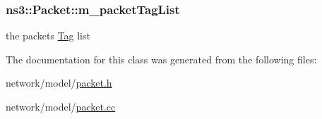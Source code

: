 \subsubsection[{\texorpdfstring{m\+\_\+packet\+Tag\+List}{m_packetTagList}}]{ ns3\+::\+Packet\+::m\+\_\+packet\+Tag\+List\hspace{0.3cm}{\ttfamily [private]}}\hypertarget{classns3_1_1Packet_a7c91fc548c7cfddf27c176e13bd858ff}{}\label{classns3_1_1Packet_a7c91fc548c7cfddf27c176e13bd858ff}


the packet\textquotesingle{}s \hyperlink{classns3_1_1Tag}{Tag} list 



The documentation for this class was generated from the following files\+:\begin{DoxyCompactItemize}
\item 
network/model/\hyperlink{packet_8h}{packet.\+h}\item 
network/model/\hyperlink{packet_8cc}{packet.\+cc}\end{DoxyCompactItemize}
